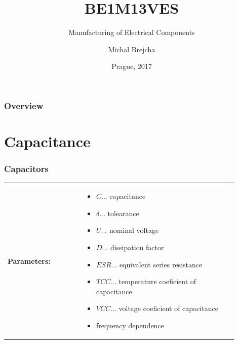 \documentclass{beamer}
\title[BE1M13VES]{BE1M13VES}
\subtitle[Manufacturing of Electrical Components] {Manufacturing of Electrical Components}
\author[Brejcha]{Michal Brejcha}
\institute[CTU]{CTU in Prague}
\date[Prague, 2017]{Prague, 2017}
\begin{document}
\frame{\titlepage}

\begin{frame}
\frametitle{Overview} 
\tableofcontents
\end{frame}


\section{\texorpdfstring{Capacitance}{Capacitance}}
	\begin{frame}
    \frametitle{Capacitors}
		\begin{tabular}{p{0.3\linewidth} p{0.6\linewidth}}
		\textbf{Parameters:} &
		\begin{itemize}
			\item $C$... capacitance
			\item $\delta$... tolearance
			\item $U$... nominal voltage
			\item $D$... dissipation factor 
			\item $ESR$... equivalent series resistance
			\item $TCC$... temperature coeficient of capacitance
			\item $VCC$... voltage coeficient of capacitance
			\item frequency dependence
		\end{itemize}
		\end{tabular}
  \end{frame}
\end{document}
